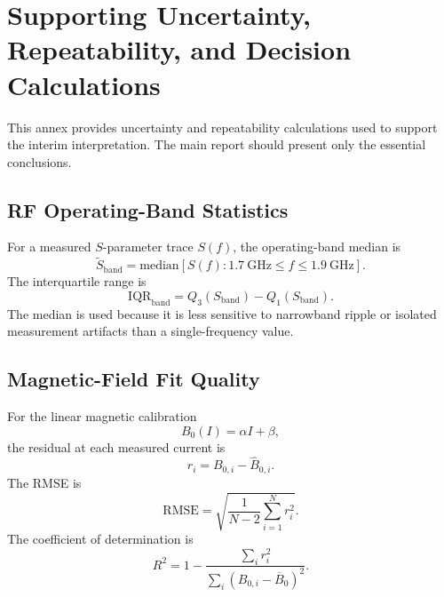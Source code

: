 \documentclass{ieeeaccess}
\begin{document}
\section{Supporting Uncertainty, Repeatability, and Decision Calculations}
\label{annex:uncertainty}

This annex provides uncertainty and repeatability calculations used to support the interim interpretation. The main report should present only the essential conclusions.

\subsection{RF Operating-Band Statistics}
\label{annex:rf_statistics}

For a measured \(S\)-parameter trace \(S(f)\), the operating-band median is
\begin{equation}
\widetilde{S}_{\mathrm{band}}
=
\mathrm{median}
\left[
S(f):1.7~\mathrm{GHz}\leq f\leq1.9~\mathrm{GHz}
\right].
\label{eq:annex_band_median}
\end{equation}
The interquartile range is
\begin{equation}
\mathrm{IQR}_{\mathrm{band}}
=
Q_3(S_{\mathrm{band}})
-
Q_1(S_{\mathrm{band}}).
\label{eq:annex_band_iqr}
\end{equation}
The median is used because it is less sensitive to narrowband ripple or isolated measurement artifacts than a single-frequency value.

\subsection{Magnetic-Field Fit Quality}
\label{annex:magnetic_fit_quality}

For the linear magnetic calibration\begin{equation}
B_0(I)=\alpha I+\beta,
\label{eq:annex_bfit}
\end{equation}
the residual at each measured current is
\begin{equation}
r_i
=
B_{0,i}
-
\widehat{B}_{0,i}.
\label{eq:annex_b_residual}
\end{equation}
The RMSE is
\begin{equation}
\mathrm{RMSE}
=
\sqrt{
\frac{1}{N-2}
\sum_{i=1}^{N}r_i^2
}.
\label{eq:annex_rmse}
\end{equation}
The coefficient of determination is
\begin{equation}
R^2
=
1-
\frac{\sum_i r_i^2}
{\sum_i(B_{0,i}-\overline{B}_0)^2}.
\label{eq:annex_r2}
\end{equation}
\end{document}
